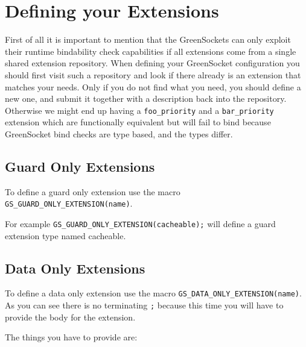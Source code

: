 \documentclass[a4paper,10pt]{article}          %
\begin{document}
\section{Defining your Extensions}

First of all it is important to mention that the GreenSockets can only exploit their runtime bindability check capabilities if all extensions come from a single shared extension repository. When defining your GreenSocket configuration you should first visit such a repository and look if there already is an extension that matches your needs. Only if you do not find what you need, you should define a new one, and submit it together with a description back into the repository. Otherwise we might end up having a \verb|foo_priority| and a \verb|bar_priority| extension which are functionally equivalent but will fail to bind because GreenSocket bind checks are type based, and the types differ.

\subsection{Guard Only Extensions}
To define a guard only extension use the macro \verb|GS_GUARD_ONLY_EXTENSION(name)|.

For example \verb|GS_GUARD_ONLY_EXTENSION(cacheable);| will define a guard extension type named cacheable.

\subsection{Data Only Extensions}
To define a data only extension use the macro \verb|GS_DATA_ONLY_EXTENSION(name)|.
As you can see there is no terminating \verb|;| because this time you will have to provide the body for the extension.

The things you have to provide are:
\end{document}
